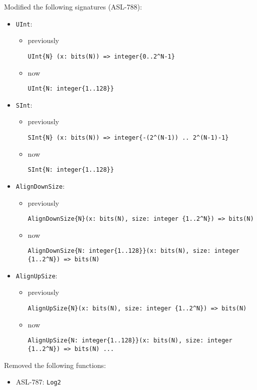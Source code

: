 \noindent
Modified the following signatures (ASL-788):
\begin{itemize}
  \item \texttt{UInt}:
    \begin{itemize}
      \item previously \begin{small}\verb|UInt{N} (x: bits(N)) => integer{0..2^N-1}|\end{small}
      \item now \begin{small}\verb|UInt{N: integer{1..128}}|\end{small}
    \end{itemize}
  \item \texttt{SInt}:
    \begin{itemize}
      \item previously \begin{small}\verb|SInt{N} (x: bits(N)) => integer{-(2^(N-1)) .. 2^(N-1)-1}|\end{small}
      \item now \begin{small}\verb|SInt{N: integer{1..128}}|\end{small}
    \end{itemize}
    \item \texttt{AlignDownSize}:
    \begin{itemize}
      \item previously
      \begin{small}\verb|AlignDownSize{N}(x: bits(N), size: integer {1..2^N}) => bits(N)|\end{small}
      \item now \begin{small}\verb|AlignDownSize{N: integer{1..128}}(x: bits(N), size: integer {1..2^N}) => bits(N)|\end{small}
    \end{itemize}
    \item \texttt{AlignUpSize}:
    \begin{itemize}
      \item previously \begin{small}\verb|AlignUpSize{N}(x: bits(N), size: integer {1..2^N}) => bits(N)|\end{small}
      \item now \begin{small}\verb|AlignUpSize{N: integer{1..128}}(x: bits(N), size: integer {1..2^N}) => bits(N) ...|\end{small}
    \end{itemize}
\end{itemize}

\noindent
Removed the following functions:
\begin{itemize}
  \item ASL-787: \texttt{Log2}
\end{itemize}
